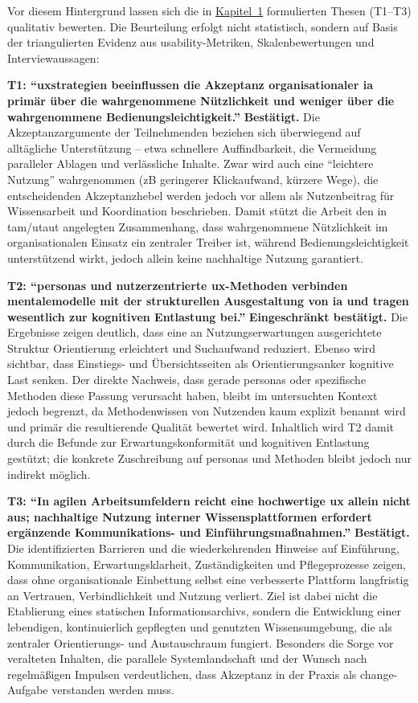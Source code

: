 Vor diesem Hintergrund lassen sich die in \hyperref[ch:01_purpose-and-objectives]{Kapitel~1} formulierten Thesen (T1--T3) qualitativ bewerten. Die Beurteilung erfolgt nicht statistisch, sondern auf Basis der triangulierten Evidenz aus \Gls{usability}-Metriken, Skalenbewertungen und Interviewaussagen:

\textbf{T1: \enquote{\Gls{uxstrategien} beeinflussen die Akzeptanz organisationaler \acrlong{ia} primär über die wahrgenommene Nützlichkeit und weniger über die wahrgenommene Bedienungsleichtigkeit.}}
\textbf{Bestätigt.} Die Akzeptanzargumente der Teilnehmenden beziehen sich überwiegend auf alltägliche Unterstützung -- etwa schnellere Auffindbarkeit, die Vermeidung paralleler Ablagen und verlässliche Inhalte. Zwar wird auch eine \enquote{leichtere Nutzung} wahrgenommen (\acrshort{zB} geringerer Klickaufwand, kürzere Wege), die entscheidenden Akzeptanzhebel werden jedoch vor allem als Nutzenbeitrag für Wissensarbeit und Koordination beschrieben. Damit stützt die Arbeit den in \acrshort{tam}/\acrshort{utaut} angelegten Zusammenhang, dass wahrgenommene Nützlichkeit im organisationalen Einsatz ein zentraler Treiber ist, während Bedienungsleichtigkeit unterstützend wirkt, jedoch allein keine nachhaltige Nutzung garantiert.

\textbf{T2: \enquote{\Gls{personas} und nutzerzentrierte \Gls{ux}-Methoden verbinden \gls{mentalemodelle} mit der strukturellen Ausgestaltung von \acrlong{ia} und tragen wesentlich zur kognitiven Entlastung bei.}}
\textbf{Eingeschränkt bestätigt.} Die Ergebnisse zeigen deutlich, dass eine an Nutzungserwartungen ausgerichtete Struktur Orientierung erleichtert und Suchaufwand reduziert. Ebenso wird sichtbar, dass Einstiegs- und Übersichtsseiten als Orientierungsanker kognitive Last senken. Der direkte Nachweis, dass gerade \Gls{personas} oder spezifische Methoden diese Passung verursacht haben, bleibt im untersuchten Kontext jedoch begrenzt, da Methodenwissen von Nutzenden kaum explizit benannt wird und primär die resultierende Qualität bewertet wird. Inhaltlich wird T2 damit durch die Befunde zur Erwartungskonformität und kognitiven Entlastung gestützt; die konkrete Zuschreibung auf \Gls{personas} und Methoden bleibt jedoch nur indirekt möglich.

\textbf{T3: \enquote{In agilen Arbeitsumfeldern reicht eine hochwertige \acrlong{ux} allein nicht aus; nachhaltige Nutzung interner Wissensplattformen erfordert ergänzende Kommunikations- und Einführungsmaßnahmen.}}
\textbf{Bestätigt.} Die identifizierten Barrieren und die wiederkehrenden Hinweise auf Einführung, Kommunikation, Erwartungsklarheit, Zuständigkeiten und Pflegeprozesse zeigen, dass ohne organisationale Einbettung selbst eine verbesserte Plattform langfristig an Vertrauen, Verbindlichkeit und Nutzung verliert. Ziel ist dabei nicht die Etablierung eines statischen Informationsarchivs, sondern die Entwicklung einer lebendigen, kontinuierlich gepflegten und genutzten Wissensumgebung, die als zentraler Orientierungs- und Austauschraum fungiert. Besonders die Sorge vor veralteten Inhalten, die parallele Systemlandschaft und der Wunsch nach regelmäßigen Impulsen verdeutlichen, dass Akzeptanz in der Praxis als \Gls{change}-Aufgabe verstanden werden muss.

